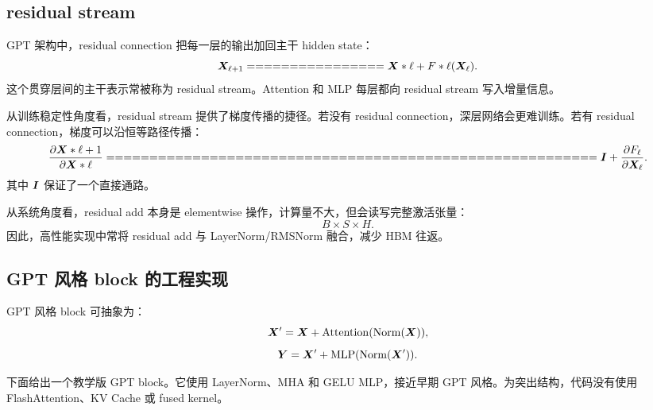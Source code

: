 \subsection{residual stream}
\label{subsec:gpt-residual-stream}

GPT 架构中，residual connection 把每一层的输出加回主干 hidden state：
\[
\mat{X}_{\ell+1}
================

\mat{X}*{\ell}
+
F*{\ell}(\mat{X}_{\ell}).
\]
这个贯穿层间的主干表示常被称为 residual stream。Attention 和 MLP 每层都向 residual stream 写入增量信息。

从训练稳定性角度看，residual stream 提供了梯度传播的捷径。若没有 residual connection，深层网络会更难训练。若有 residual connection，梯度可以沿恒等路径传播：
\[
\frac{\partial \mat{X}*{\ell+1}}{\partial \mat{X}*{\ell}}
=========================================================

\mat{I}
+
\frac{\partial F_{\ell}}{\partial \mat{X}_{\ell}}.
\]
其中 $\bm{I}$ 保证了一个直接通路。

从系统角度看，residual add 本身是 elementwise 操作，计算量不大，但会读写完整激活张量：
\[
B\times S\times H.
\]
因此，高性能实现中常将 residual add 与 LayerNorm/RMSNorm 融合，减少 HBM 往返。

\subsection{GPT 风格 block 的工程实现}
\label{subsec:gpt-style-block-engineering}

GPT 风格 block 可抽象为：
\[
\bm{X}'=\bm{X}+\operatorname{Attention}(\operatorname{Norm}(\bm{X})),
\]
\[
\bm{Y}=\bm{X}'+\operatorname{MLP}(\operatorname{Norm}(\bm{X}')).
\]

下面给出一个教学版 GPT block。它使用 LayerNorm、MHA 和 GELU MLP，接近早期 GPT 风格。为突出结构，代码没有使用 FlashAttention、KV Cache 或 fused kernel。

